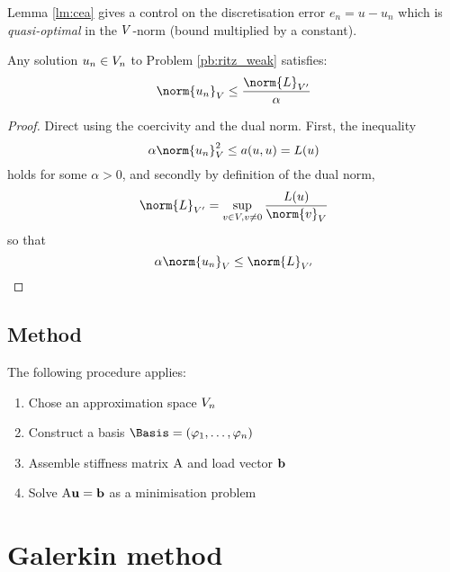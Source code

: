 Lemma \eqref{lm:cea} gives a control on the discretisation error $e_n = u - u_n$ which is \textit{quasi-optimal} in the ${V}$-norm (\ie bound multiplied by a constant).

\begin{lmm}[Stability]\label{lm:stability_elliptic}
Any solution $u_n \in {V}_n$ to Problem \eqref{pb:ritz_weak} satisfies:
\begin{equation*}
\norm{u_n}_\xV  \leq \dfrac{\norm{L}_{\xV'}}{\alpha}
\end{equation*}
\end{lmm}
\begin{proof}
Direct using the coercivity and the dual norm.
First, the inequality
\begin{equation*}
\alpha\norm{u_n}^2_\xV  \leq a(u, u) = L(u)
\end{equation*}
holds for some $\alpha > 0$, and secondly by definition of the dual norm,
\begin{equation*}
\norm{L}_{\xV'} = \sup_{v\in\xV, v\neq 0} \frac{L(u)}{\norm{v}_\xV}
\end{equation*}
so that
\begin{equation*}
\alpha\norm{u_n}_\xV  \leq \norm{L}_{\xV'}
\end{equation*}
\end{proof}

\subsection{Method}

\begin{lgrthm}\label{alg:ritz} The following procedure applies:
\begin{enumerate}
\item Chose an approximation space ${V}_n$
\item Construct a basis $\Basis= (\varphi_1,\dots,\varphi_n)$
\item Assemble stiffness matrix ${\mathrm A}$ and load vector $\mathbf b$
\item Solve ${\mathrm A} \mathbf u = \mathbf b$ as a minimisation problem
\end{enumerate}
\end{lgrthm}

\section{Galerkin method}

